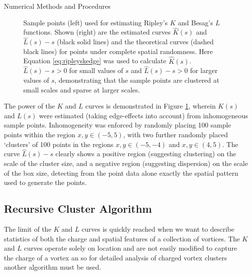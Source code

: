 \begin{chapter}{\label{cha:numerics}Numerical Methods and Procedures}
\begin{figure}[!ht]
\begin{minipage}{0.5\linewidth}
%
  \end{minipage}%
  \caption{Sample points (left) used for estimating Ripley's $K$ and Besag's $L$ functions. Shown (right) are the estimated curves $\hat{K}(s)$ and $\hat{L}(s)-s$ (black solid lines) and the theoretical curves (dashed black lines) for points under complete spatial randomness. Here Equation \ref{eq:ripleyskedge} was used to calculate $\hat K(s)$. $\hat{L}(s)-s > 0$ for small values of $s$ and $\hat{L}(s)-s > 0$ for larger values of $s$, demonstrating that the sample points are clustered at small scales and sparse at larger scales.\label{fig:ripleyexample}}
 \end{figure}

  The power of the $K$ and $L$ curves is demonstrated in Figure \ref{fig:ripleyexample}, wherein $K(s)$ and $L(s)$ were estimated (taking edge-effects into account) from inhomogeneous sample points. Inhomogeneity was enforced by randomly placing 100 sample points within the region $x,y \in (-5,5)$, with two further randomly placed `clusters' of 100 points in the regions $x,y \in (-5,-4)$ and $x,y \in (4,5)$. The curve $\hat{L}(s)-s$ clearly shows a positive region (suggesting clustering) on the scale of the cluster size, and a negative region (suggesting dispersion) on the scale of the box size, detecting from the point data alone exactly the spatial pattern used to generate the points.

  
\subsection{\label{section:reevesalgorithm} Recursive Cluster Algorithm }
The limit of the $K$ and $L$ curves is quickly reached when we want to describe statistics of both the charge and spatial features of a collection of vortices. The $K$ and $L$ curves operate solely on location and are not easily modified to capture the charge of a vortex an so for detailed analysis of charged vortex clusters another algorithm must be used.


\end{chapter}

